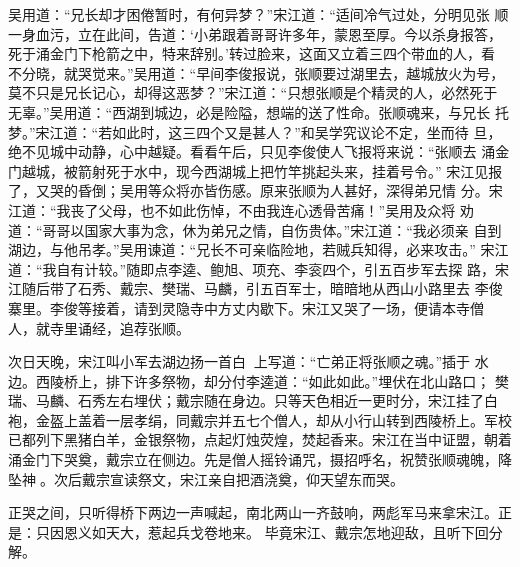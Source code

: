 吴用道：“兄长却才困倦暂时，有何异梦？”宋江道：“适间冷气过处，分明见张
顺一身血污，立在此间，告道：‘小弟跟着哥哥许多年，蒙恩至厚。今以杀身报答，
死于涌金门下枪箭之中，特来辞别。’转过脸来，这面又立着三四个带血的人，看
不分晓，就哭觉来。”吴用道：“早间李俊报说，张顺要过湖里去，越城放火为号，
莫不只是兄长记心，却得这恶梦？”宋江道：“只想张顺是个精灵的人，必然死于
无辜。”吴用道：“西湖到城边，必是险隘，想端的送了性命。张顺魂来，与兄长
托梦。”宋江道：“若如此时，这三四个又是甚人？”和吴学究议论不定，坐而待
旦，绝不见城中动静，心中越疑。看看午后，只见李俊使人飞报将来说：“张顺去
涌金门越城，被箭射死于水中，现今西湖城上把竹竿挑起头来，挂着号令。”
宋江见报了，又哭的昏倒；吴用等众将亦皆伤感。原来张顺为人甚好，深得弟兄情
分。宋江道：“我丧了父母，也不如此伤悼，不由我连心透骨苦痛！”吴用及众将
劝道：“哥哥以国家大事为念，休为弟兄之情，自伤贵体。”宋江道：“我必须亲
自到湖边，与他吊孝。”吴用谏道：“兄长不可亲临险地，若贼兵知得，必来攻击。”
宋江道：“我自有计较。”随即点李逵、鲍旭、项充、李衮四个，引五百步军去探
路，宋江随后带了石秀、戴宗、樊瑞、马麟，引五百军士，暗暗地从西山小路里去
李俊寨里。李俊等接着，请到灵隐寺中方丈内歇下。宋江又哭了一场，便请本寺僧
人，就寺里诵经，追荐张顺。

次日天晚，宋江叫小军去湖边扬一首白，上写道：“亡弟正将张顺之魂。”插于
水边。西陵桥上，排下许多祭物，却分付李逵道：“如此如此。”埋伏在北山路口；
樊瑞、马麟、石秀左右埋伏；戴宗随在身边。只等天色相近一更时分，宋江挂了白
袍，金盔上盖着一层孝绢，同戴宗并五七个僧人，却从小行山转到西陵桥上。军校
已都列下黑猪白羊，金银祭物，点起灯烛荧煌，焚起香来。宋江在当中证盟，朝着
涌金门下哭奠，戴宗立在侧边。先是僧人摇铃诵咒，摄招呼名，祝赞张顺魂魄，降
坠神。次后戴宗宣读祭文，宋江亲自把酒浇奠，仰天望东而哭。

正哭之间，只听得桥下两边一声喊起，南北两山一齐鼓响，两彪军马来拿宋江。正
是：只因恩义如天大，惹起兵戈卷地来。
毕竟宋江、戴宗怎地迎敌，且听下回分解。